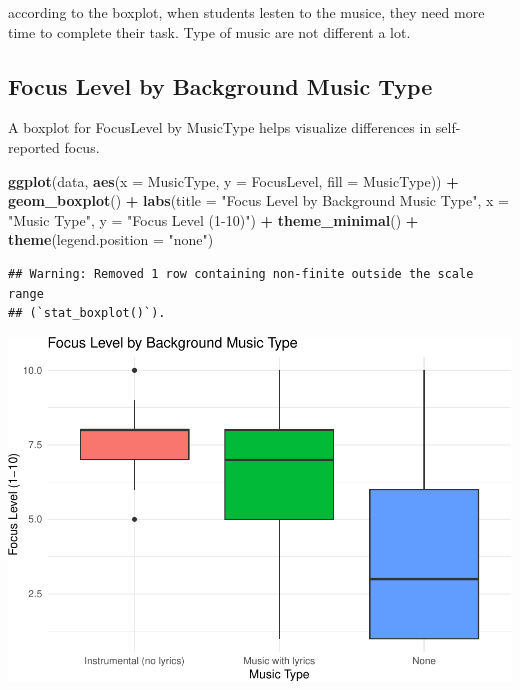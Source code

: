 \documentclass[
]{article}
\newenvironment{Shaded}{\begin{snugshade}}{\end{snugshade}}
\newcommand{\AttributeTok}[1]{\textcolor[rgb]{0.13,0.29,0.53}{#1}}
\newcommand{\FunctionTok}[1]{\textcolor[rgb]{0.13,0.29,0.53}{\textbf{#1}}}
\newcommand{\NormalTok}[1]{#1}
\newcommand{\SpecialCharTok}[1]{\textcolor[rgb]{0.81,0.36,0.00}{\textbf{#1}}}
\newcommand{\StringTok}[1]{\textcolor[rgb]{0.31,0.60,0.02}{#1}}
\begin{document}
according to the boxplot, when students lesten to the musice, they need
more time to complete their task. Type of music are not different a lot.

\subsection{Focus Level by Background Music
Type}\label{focus-level-by-background-music-type}

A boxplot for FocusLevel by MusicType helps visualize differences in
self-reported focus.

\begin{Shaded}
\begin{Highlighting}[]
\FunctionTok{ggplot}\NormalTok{(data, }\FunctionTok{aes}\NormalTok{(}\AttributeTok{x =}\NormalTok{ MusicType, }\AttributeTok{y =}\NormalTok{ FocusLevel, }\AttributeTok{fill =}\NormalTok{ MusicType)) }\SpecialCharTok{+}
  \FunctionTok{geom\_boxplot}\NormalTok{() }\SpecialCharTok{+}
  \FunctionTok{labs}\NormalTok{(}\AttributeTok{title =} \StringTok{"Focus Level by Background Music Type"}\NormalTok{,}
       \AttributeTok{x =} \StringTok{"Music Type"}\NormalTok{,}
       \AttributeTok{y =} \StringTok{"Focus Level (1{-}10)"}\NormalTok{) }\SpecialCharTok{+}
  \FunctionTok{theme\_minimal}\NormalTok{() }\SpecialCharTok{+}
  \FunctionTok{theme}\NormalTok{(}\AttributeTok{legend.position =} \StringTok{"none"}\NormalTok{)}
\end{Highlighting}
\end{Shaded}

\begin{verbatim}
## Warning: Removed 1 row containing non-finite outside the scale range
## (`stat_boxplot()`).
\end{verbatim}

\includegraphics{Assignment2_files/figure-latex/unnamed-chunk-3-1.pdf}
\end{document}
